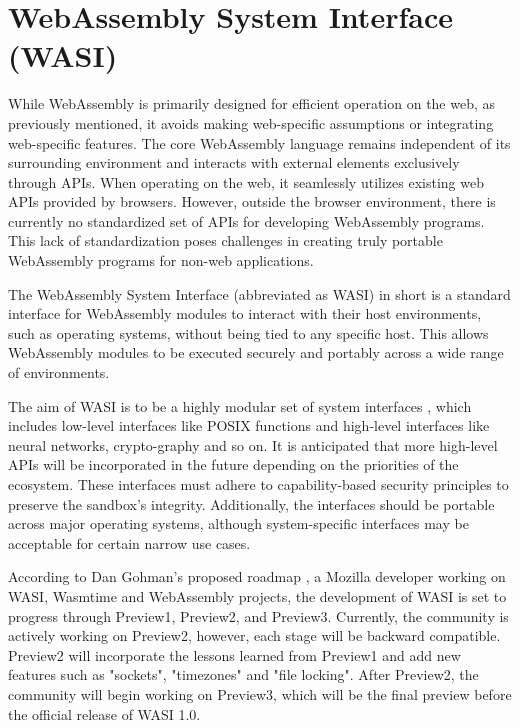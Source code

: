 \section{WebAssembly System Interface (WASI)}
\label{sec:wasi}

While WebAssembly is primarily designed for efficient operation on the web, as previously mentioned, it avoids making web-specific assumptions or integrating web-specific features. 
The core WebAssembly language remains independent of its surrounding environment and interacts with external elements exclusively through APIs. When operating on the web, it seamlessly utilizes existing web APIs provided by browsers. However, outside the browser environment, there is currently no standardized set of APIs for developing WebAssembly programs. This lack of standardization poses challenges in creating truly portable WebAssembly programs for non-web applications.

The WebAssembly System Interface (abbreviated as WASI) in short is a standard interface for WebAssembly modules to interact with their host environments, such as operating systems, without being tied to any specific host. This allows WebAssembly modules to be executed securely and portably across a wide range of environments. 

The aim of WASI is to be a highly modular set of system interfaces \cite{clark_2022_wasi}, which includes low-level interfaces like \gls{POSIX} functions and high-level interfaces like neural networks, crypto-graphy and so on. 
It is anticipated that more high-level APIs will be incorporated in the future depending on the priorities of the ecosystem. These interfaces must adhere to capability-based security principles to preserve the sandbox's integrity. Additionally, the interfaces should be portable across major operating systems, although system-specific interfaces may be acceptable for certain 
narrow use cases.

According to Dan Gohman's proposed roadmap \cite{gohman_2023_wasi}, a Mozilla developer working on WASI, Wasmtime and WebAssembly projects, the development of WASI is set to progress through Preview1, Preview2, and Preview3. 
Currently, the community is actively working on Preview2, however, each stage will be backward compatible. Preview2 will incorporate the lessons learned from Preview1 and add new features such as "sockets", "timezones" and "file locking". After Preview2, the community will begin working on Preview3, which will be the final preview before the official release of WASI 1.0.


